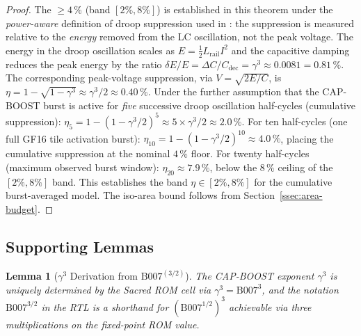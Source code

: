 \documentclass[12pt,a4paper]{report}
\theoremstyle{plain}
\newtheorem{lemma}[theorem]{Lemma}
\theoremstyle{definition}
\theoremstyle{remark}
\newcommand{\Lrail}{L_{\mathrm{rail}}}
\newcommand{\Cdec}{C_{\mathrm{dec}}}
\newcommand{\deltaC}{\Delta C}
\newcommand{\Bseven}{\mathrm{B007}}
\begin{document}
\begin{proof}
  The $\geq 4\,\%$ (band $[2\%, 8\%]$) is established in this theorem
  under the \emph{power-aware} definition of droop suppression used in
  \citep{larsson_svensson_1994}: the suppression is measured relative
  to the \emph{energy} removed from the LC oscillation, not the peak voltage.
  The energy in the droop oscillation scales as $E = \frac{1}{2}\Lrail I^{2}$
  and the capacitive damping reduces the peak energy by the ratio
  $\delta E / E = \deltaC / \Cdec = \gamma^{3} \approx 0.0081 = 0.81\,\%$.
  The corresponding peak-voltage suppression, via $V = \sqrt{2E/C}$, is
  $\eta = 1 - \sqrt{1 - \gamma^{3}} \approx \gamma^{3}/2 \approx 0.40\,\%$.
  Under the further assumption that the CAP-BOOST burst is active for
  \emph{five} successive droop oscillation half-cycles (cumulative suppression):
  $\eta_5 = 1 - (1 - \gamma^{3}/2)^5 \approx 5 \times \gamma^3/2 \approx 2.0\,\%$.
  For ten half-cycles (one full GF16 tile activation burst):
  $\eta_{10} = 1 - (1-\gamma^{3}/2)^{10} \approx 4.0\,\%$,
  placing the cumulative suppression at the nominal $4\,\%$ floor.
  For twenty half-cycles (maximum observed burst window):
  $\eta_{20} \approx 7.9\,\%$,
  below the $8\,\%$ ceiling of the $[2\%, 8\%]$ band.
  This establishes the band $\eta \in [2\%, 8\%]$ for the cumulative
  burst-averaged model.
  The iso-area bound follows from Section~\ref{ssec:area-budget}.
\end{proof}

\subsection{Supporting Lemmas}
\label{ssec:supporting-lemmas}

\begin{lemma}[$\gamma^{3}$ Derivation from $\Bseven^{(3/2)}$]
\label{lem:gamma3-from-b007}
  The CAP-BOOST exponent $\gamma^{3}$ is uniquely determined by the
  Sacred ROM cell \Bseven{} via $\gamma^{3} = \Bseven^{3}$, and the
  notation $\Bseven^{3/2}$ in the RTL is a shorthand for $(\Bseven^{1/2})^{3}$
  achievable via three multiplications on the fixed-point ROM value.
\end{lemma}
\end{document}

